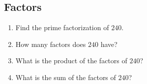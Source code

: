 \documentclass[twocolumn]{article}
\begin{document}
\subsection*{Factors}
\begin{enumerate}[resume]
	\item Find the prime factorization of $240$.
		\vspace{3cm}
	\item How many factors does $240$ have?
		\vspace{3cm}
	\item What is the product of the factors of $240$?
		\vspace{3cm}
	\item What is the sum of the factors of $240$?
		\vspace{3cm}
		\vspace{3cm}
\end{enumerate}
\end{document}
